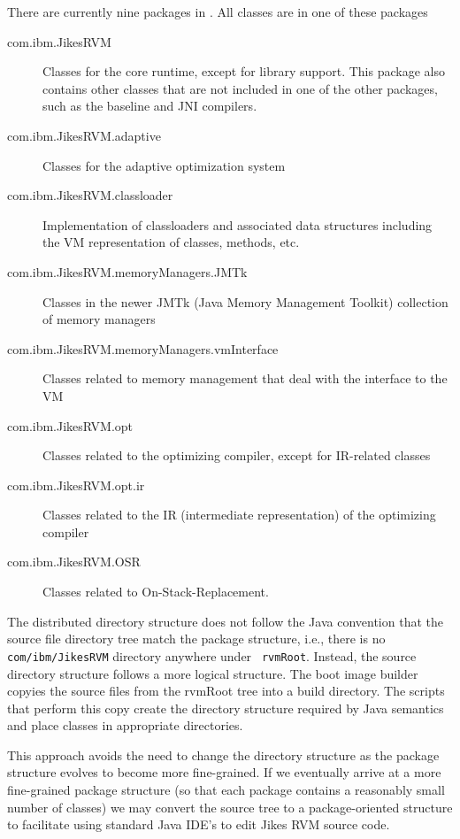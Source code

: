 There are currently nine packages in \jrvm. All classes are in
one of these packages
\begin{description}
\item [com.ibm.JikesRVM] Classes for the core runtime, except for library
support.  This package also contains other classes that are not
included in one of the other packages, such as the baseline and JNI
compilers. 

\item [com.ibm.JikesRVM.adaptive] Classes for the adaptive optimization system

\item [com.ibm.JikesRVM.classloader] Implementation of classloaders
and associated data structures including the VM representation of classes,
methods, etc. 

\item [com.ibm.JikesRVM.memoryManagers.JMTk] Classes in the newer JMTk
(Java Memory Management Toolkit) collection of memory managers

\item [com.ibm.JikesRVM.memoryManagers.vmInterface] Classes related to
memory management that deal with the interface to the VM

\item [com.ibm.JikesRVM.opt] Classes related to the optimizing
compiler, except for IR-related classes

\item [com.ibm.JikesRVM.opt.ir] Classes related to the IR
(intermediate representation) of the optimizing compiler

\item [com.ibm.JikesRVM.OSR] Classes related to On-Stack-Replacement. 

\end{description}

The distributed directory structure
does not follow the Java convention that the source file directory tree
match the package structure, i.e.,
there is no {\tt com/ibm/JikesRVM} directory anywhere under {\tt
rvmRoot}.  Instead, the source directory structure follows a more logical 
structure.  The boot image builder
copyies the source files from the rvmRoot tree into a build
directory.  The scripts that perform this copy create the directory
structure required by Java semantics and place classes in appropriate
directories.

This approach avoids the need to change the directory structure as the
package structure evolves to become more fine-grained. If we
eventually arrive at a more fine-grained package structure (so that
each package contains a reasonably small number of classes) we may
convert the source tree to a package-oriented structure to facilitate
using standard Java IDE's to edit Jikes RVM source code.
